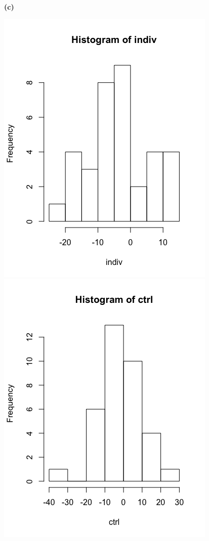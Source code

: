 \documentclass[11pt]{article}
\renewcommand\part[1]{\vspace{.10in}\textbf{(#1)}\par}
\begin{document}
  \part{c}
    \includegraphics[scale=0.38]{images/indivHist.png}
		\includegraphics[scale=0.38]{images/ctrlHist.png}
\end{document}
